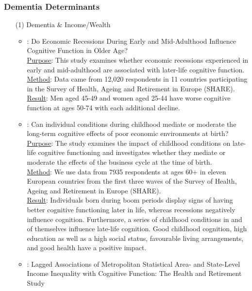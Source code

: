 \documentclass[12pt]{article}
\begin{document}
\subsubsection{Dementia Determinants}
\begin{itemize}
    \item[(1)] Dementia \& Income/Wealth
    \begin{itemize}
        \item \cite{leist2014economic}: Do Economic Recessions During Early and Mid-Adulthood Influence Cognitive Function in Older Age? \\
        \uline{Purpose}: 
        This study examines whether economic recessions experienced in early and mid-adulthood are associated with later-life cognitive function.\\
        \uline{Method}: 
        Data came from 12,020 respondents in 11 countries participating in the Survey of Health, Ageing and Retirement in Europe (SHARE).\\
        \uline{Result}: 
        Men aged 45-49 and women aged 25-44 have worse cognitive function at ages 50-74 with each additional decline.
        \item \cite{fritze2014can}: Can individual conditions during childhood mediate or moderate the long-term cognitive effects of poor economic environments at birth? \\
        \uline{Purpose}: 
        The study examines the impact of childhood conditions on late-life cognitive functioning and investigates whether they mediate or moderate the effects of the business cycle at the time of birth. \\ 
        \uline{Method}: 
        We use data from 7935 respondents at ages 60+ in eleven European countries from the first three waves of the Survey of Health, Ageing and Retirement in Europe (SHARE). \\
        \uline{Result}: 
        Individuals born during boom periods display signs of having better cognitive functioning later in life, whereas recessions negatively influence cognition. Furthermore, a series of childhood conditions in and of themselves influence late-life cognition. Good childhood cognition, high education as well as a high social status, favourable living arrangements, and good health have a positive impact.
        \item \cite{kim2016lagged}: Lagged Associations of Metropolitan Statistical Area- and State-Level Income Inequality with Cognitive Function: The Health and Retirement Study \\

\end{itemize}
\end{itemize}
\end{document}
